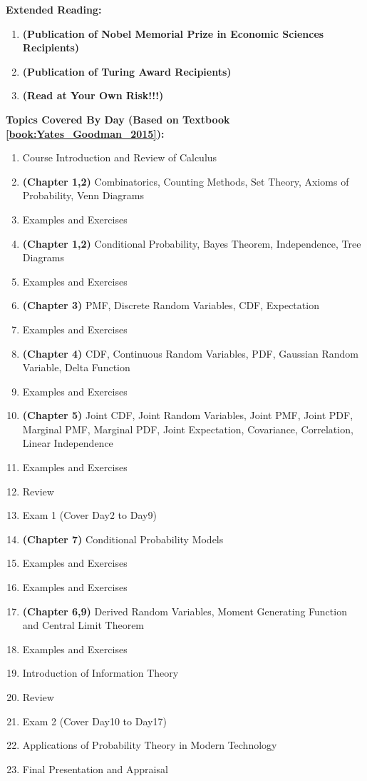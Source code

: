 \documentclass{article}
\begin{document}
\textbf{Extended Reading:}{
    \begin{enumerate}
            \item \textbf{(Publication of Nobel Memorial Prize in Economic Sciences Recipients)} 
            \item \textbf{(Publication of Turing Award Recipients)} 
            \item \textbf{(Read at Your Own Risk!!!)} 
    \end{enumerate}
}

\textbf{Topics Covered By Day (Based on Textbook \cref{book:Yates_Goodman_2015}):} {
    \begin{enumerate}
        \item Course Introduction and Review of Calculus
        \item \textbf{(Chapter 1,2)} Combinatorics, Counting Methods, Set Theory, Axioms of Probability, Venn Diagrams
        \item Examples and Exercises
        \item \textbf{(Chapter 1,2)} Conditional Probability, Bayes Theorem, Independence, Tree Diagrams
        \item Examples and Exercises
        \item \textbf{(Chapter 3)} PMF, Discrete Random Variables, CDF, Expectation
        \item Examples and Exercises
        \item \textbf{(Chapter 4)} CDF, Continuous Random Variables, PDF, Gaussian Random Variable, Delta Function
        \item Examples and Exercises
        \item \textbf{(Chapter 5)} Joint CDF, Joint Random Variables, Joint PMF, Joint PDF, Marginal PMF, Marginal PDF, Joint Expectation, Covariance, Correlation, Linear Independence
        \item Examples and Exercises
        \item Review
        \item Exam 1 (Cover Day2 to Day9)
        \item \textbf{(Chapter 7)} Conditional Probability Models
        \item Examples and Exercises
        \item Examples and Exercises
        \item \textbf{(Chapter 6,9)} Derived Random Variables, Moment Generating Function and Central Limit Theorem
        \item Examples and Exercises
        \item Introduction of Information Theory
        \item Review
        \item Exam 2 (Cover Day10 to Day17)
        \item Applications of Probability Theory in Modern Technology
        \item Final Presentation and Appraisal
    \end{enumerate}
}
\end{document}
